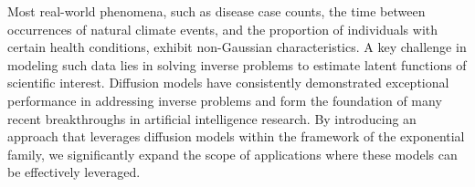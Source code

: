 Most real-world phenomena, such as disease case counts, the time between occurrences of natural climate events, and the proportion of individuals with certain health conditions, exhibit non-Gaussian characteristics. A key challenge in modeling such data lies in solving inverse problems to estimate latent functions of scientific interest. Diffusion models have consistently demonstrated exceptional performance in addressing inverse problems and form the foundation of many recent breakthroughs in artificial intelligence research. By introducing an approach that leverages diffusion models within the framework of the exponential family, we significantly expand the scope of applications where these models can be effectively leveraged.

